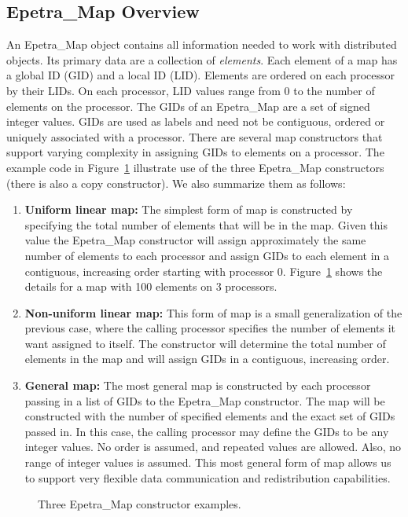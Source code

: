 \documentclass[12pt,relax]{EpetraUserGuide}
\newcommand{\map}{Epetra\_Map}
\begin{document}
\subsection{\map{} Overview}
An \map{} object contains all information needed to work with
distributed objects.  Its primary data are a collection of {\it
elements}.  Each element of a map has a global ID (GID) and a local ID
(LID).  Elements are ordered on each processor by their LIDs.  On each
processor, LID values range from 0 to the number of elements on the
processor.  The GIDs
of an \map{} are a set of signed integer values.  GIDs are used as
labels and need not be contiguous, ordered or uniquely associated with
a processor.  There are several map constructors that support varying
complexity in assigning GIDs to elements on a processor.  The example
code in Figure~\ref{Figure:MapExamples} illustrate use of the three
\map{} constructors (there is also a copy constructor).  We also
summarize them as follows:
\begin{enumerate}
\item {\bf Uniform linear map:}  The simplest form of map is
constructed by specifying the total number of elements that will be in
the map.  Given this value the \map{} constructor will assign
approximately the same number of elements to each processor and assign
GIDs to each element in a contiguous, increasing order starting with
processor 0.  Figure~\ref{Figure:MapExamples} shows the details for a
map with 100 elements on 3 processors.
\item {\bf Non-uniform linear map:}  This form of map is a small
generalization of the previous case,
where the calling processor specifies the number of
elements it want assigned to itself.  The constructor will determine
the total number of elements in the map and will assign GIDs in a
contiguous, increasing order.
\item {\bf General map:} The most general map is constructed by each
processor passing in a list of GIDs to the \map{} constructor.  The
map will be constructed with the number of specified elements and the
exact set of GIDs passed in.  In this case, the calling processor may
define the GIDs to be any integer values.  No order is assumed, and
repeated values are allowed.  Also, no range of integer values is
assumed.  This most general form of map allows us to support very
flexible data communication and redistribution capabilities.
\end{enumerate}
\begin{figure}
\begin{center}

\end{center}
\caption{\label{Figure:MapExamples} Three \map{} constructor examples.}
\end{figure}
\end{document}
